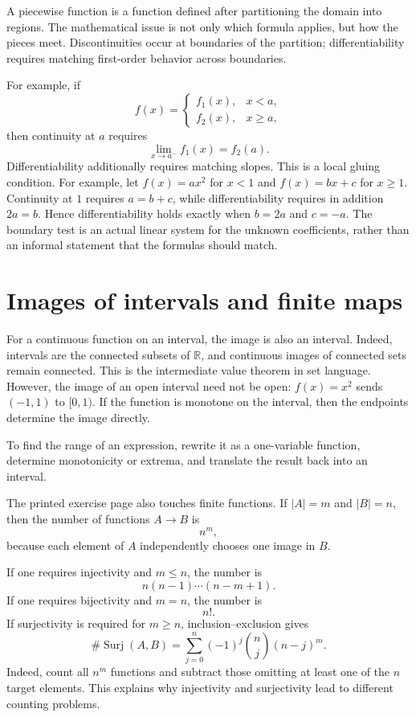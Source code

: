 A piecewise function is a function defined after partitioning the domain into regions.  The mathematical issue is not only which formula applies, but how the pieces meet.  Discontinuities occur at boundaries of the partition; differentiability requires matching first-order behavior across boundaries.

For example, if
\[
  f(x)=\begin{cases}f_1(x),&x<a,\\ f_2(x),&x\ge a,
  \end{cases}
\]
then continuity at $a$ requires
\[
  \lim_{x\to a^-}f_1(x)=f_2(a).
\]
Differentiability additionally requires matching slopes.  This is a local gluing condition. For example, let \(f(x)=ax^2\) for \(x<1\) and \(f(x)=bx+c\) for \(x\ge1\). Continuity at \(1\) requires \(a=b+c\), while differentiability requires in addition \(2a=b\). Hence differentiability holds exactly when \(b=2a\) and \(c=-a\). The boundary test is an actual linear system for the unknown coefficients, rather than an informal statement that the formulas should match.

\section{Images of intervals and finite maps}

For a continuous function on an interval, the image is also an interval.  Indeed, intervals are the connected subsets of \(\mathbb R\), and continuous images of connected sets remain connected. This is the intermediate value theorem in set language. However, the image of an open interval need not be open: \(f(x)=x^2\) sends \((-1,1)\) to \([0,1)\).  If the function is monotone on the interval, then the endpoints determine the image directly.

To find the range of an expression, rewrite it as a one-variable function, determine monotonicity or extrema, and translate the result back into an interval.

The printed exercise page also touches finite functions.  If $|A|=m$ and $|B|=n$, then the number of functions $A\to B$ is
\[
  n^m,
\]
because each element of $A$ independently chooses one image in $B$.

If one requires injectivity and $m\le n$, the number is
\[
  n(n-1)\cdots(n-m+1).
\]
If one requires bijectivity and $m=n$, the number is
\[
  n!.
\]
If surjectivity is required for \(m\ge n\), inclusion--exclusion gives
\[
 \#\operatorname{Surj}(A,B)=\sum_{j=0}^{n}(-1)^j\binom nj(n-j)^m.
\]
Indeed, count all \(n^m\) functions and subtract those omitting at least one of the \(n\) target elements. This explains why injectivity and surjectivity lead to different counting problems.

